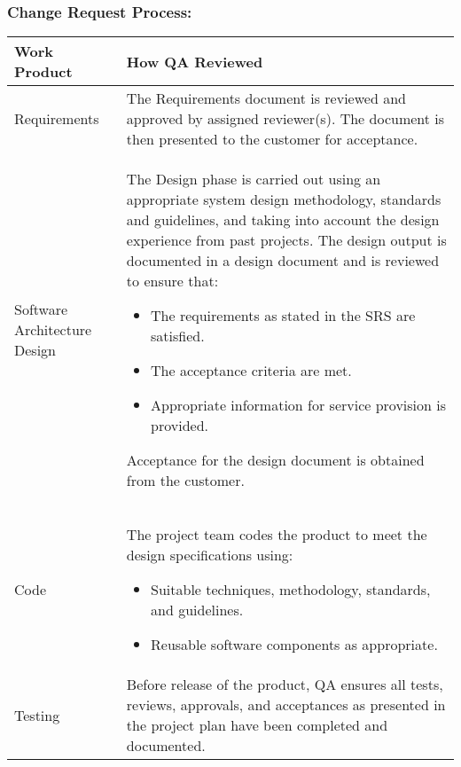 \documentclass[a3paper, 11pt]{article}
\begin{document}
\subsubsection{Change Request Process:}
\begin{tabular} {|p{2cm}|p{13.4cm}|}
	\hline
	\textbf{Work Product} & \textbf{How QA Reviewed} \\ \hline
	Requirements & The Requirements document is reviewed and approved by assigned reviewer(s). The document is then presented to the customer for acceptance. \\ \hline
	Software Architecture Design & The Design phase is carried out using an appropriate system design methodology, standards and guidelines, and taking into account the design experience from past projects. The design output is documented in a design document and is reviewed to ensure that:
	\begin{itemize}
		\setlength\itemsep{-0.25em}
		\item The requirements as stated in the SRS are satisfied. 
		\item The acceptance criteria are met.
		\item Appropriate information for service provision is provided. 
	\end{itemize}
	Acceptance for the design document is obtained from the customer. \\ \hline
	Code & The project team codes the product to meet the design specifications using: 
	\begin{itemize}
		\setlength\itemsep{-0.25em}
		\item Suitable techniques, methodology, standards, and guidelines. 
		\item Reusable software components as appropriate.
	\end{itemize}
	\\ \hline
	Testing & Before release of the product, QA ensures all tests, reviews, approvals, and acceptances as presented in the project plan have been completed and documented. \\ \hline
\end{tabular}
\end{document}
